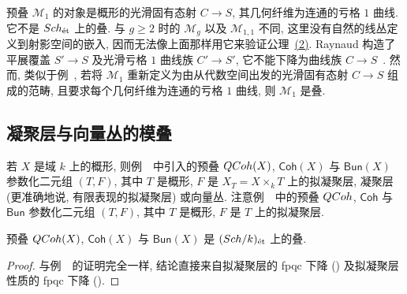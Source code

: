 \begin{remark}[亏格 $1$ 的曲线的模]\label{src:3.5.16}
预叠 $\mathcal M_1$ 的对象是概形的光滑固有态射 $C\to S$, 其几何纤维为连通的亏格 $1$ 曲线. 它不是 $Sch_{\text{ét}}$ 上的叠. 与 $g\geq2$ 时的 $\mathcal M_g$ 以及 $\mathcal M_{1,1}$ 不同, 这里没有自然的线丛定义到射影空间的嵌入, 因而无法像上面那样用它来验证公理~\hyperlink{stack-axiom-2}{(2)}.
Raynaud 构造了平展覆盖 $S'\to S$ 及光滑亏格 $1$ 曲线族 $C'\to S'$, 它不能下降为曲线族 $C\to S$~\cite[XIII 3.2]{Ray70}.
然而, 类似于例~, 若将 $\mathcal M_1$ 重新定义为由从代数空间出发的光滑固有态射 $C\to S$ 组成的范畴, 且要求每个几何纤维为连通的亏格 $1$ 曲线, 则 $\mathcal M_1$ 是叠.
\end{remark}

\subsection{凝聚层与向量丛的模叠}\label{src:3.5.5-subsection}
若 $X$ 是域 $k$ 上的概形, 则例~~中引入的预叠 $QCoh(X)$, $\mathsf{Coh}(X)$ 与 $\mathsf{Bun}(X)$ 参数化二元组 $(T,F)$, 其中 $T$ 是概形, $F$ 是 $X_T=X\times_k T$ 上的拟凝聚层, 凝聚层 (更准确地说, 有限表现的拟凝聚层) 或向量丛.
注意例~~中的预叠 $QCoh$, $\mathsf{Coh}$ 与 $\mathsf{Bun}$ 参数化二元组 $(T,F)$, 其中 $T$ 是概形, $F$ 是 $T$ 上的拟凝聚层.
\begin{proposition}\label{src:3.5.17}
预叠 $QCoh(X)$, $\mathsf{Coh}(X)$ 与 $\mathsf{Bun}(X)$ 是 $(Sch/k)_{\text{ét}}$ 上的叠.
\end{proposition}
\begin{proof}
与例~~的证明完全一样, 结论直接来自拟凝聚层的 fpqc 下降 () 及拟凝聚层性质的 fpqc 下降 ().
\end{proof}

